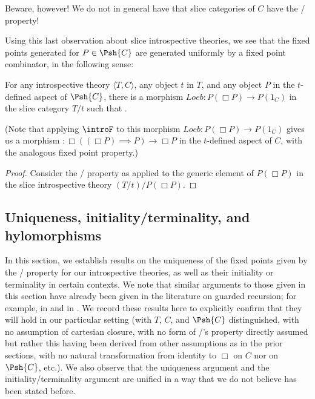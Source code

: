 Beware, however! We do not in general have that slice categories of $C$ have the \Loeb/ property! 

Using this last observation about slice introspective theories, we see that the fixed points generated for $P \in \Psh{C}$ are generated uniformly by a fixed point combinator, in the following sense:
\begin{theorem}
For any introspective theory $\langle T, C \rangle$, any object $t$ in $T$, and any object $P$ in the $t$-defined aspect of $\Psh{C}$, there is a morphism $Loeb : P(\Box P) \to P(1_C)$ in the slice category $T/t$ such that \TODO.

(Note that applying $\introF$ to this morphism $Loeb : P(\Box P) \to P(1_C)$ gives us a morphism $: \Box((\Box P) \implies P) \to \Box P$ in the $t$-defined aspect of $C$, with the analogous fixed point property.)
\end{theorem}
\begin{proof}
Consider the \Loeb/ property as applied to the generic element of $P(\Box P)$ in the slice introspective theory $(T/t)/P(\Box P)$.
\end{proof}

\subsection{Uniqueness, initiality/terminality, and hylomorphisms}\label{LoebPropertyReduxSection}
In this section, we establish results on the uniqueness of the fixed points given by the \Loeb/ property for our introspective theories, as well as their initiality or terminality in certain contexts. We note that similar arguments to those given in this section have already been given in the literature on guarded recursion; for example, in \autocite{birkedal2011first} and in \autocite{birkedal2013universes}. We record these results here to explicitly confirm that they will hold in our particular setting (with $T$, $C$, and $\Psh{C}$ distinguished, with no assumption of cartesian closure, with no form of \Loeb/'s property directly assumed but rather this having been derived from other assumptions as in the prior sections, with no natural transformation from identity to $\Box$ on $C$ nor on $\Psh{C}$, etc.). We also observe that the uniqueness argument and the initiality/terminality argument are unified in a way that we do not believe has been stated before.

